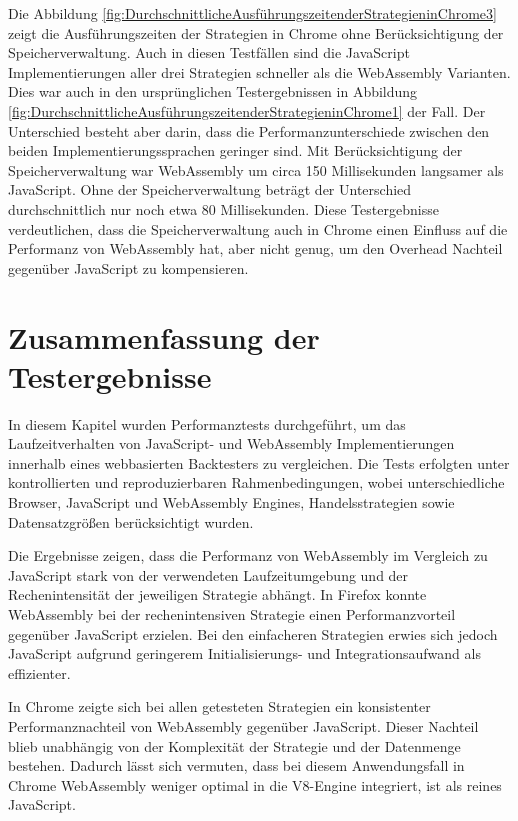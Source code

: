 Die Abbildung \ref{fig:DurchschnittlicheAusführungszeitenderStrategieninChrome3} zeigt die Ausführungszeiten der Strategien in Chrome ohne Berücksichtigung der Speicherverwaltung.
Auch in diesen Testfällen sind die JavaScript Implementierungen aller drei Strategien schneller als die WebAssembly Varianten.
Dies war auch in den ursprünglichen Testergebnissen in Abbildung \ref{fig:DurchschnittlicheAusführungszeitenderStrategieninChrome1} der Fall.
Der Unterschied besteht aber darin, dass die Performanzunterschiede zwischen den beiden Implementierungssprachen geringer sind.
Mit Berücksichtigung der Speicherverwaltung war WebAssembly um circa 150 Millisekunden langsamer als JavaScript.
Ohne der Speicherverwaltung beträgt der Unterschied durchschnittlich nur noch etwa 80 Millisekunden.
Diese Testergebnisse verdeutlichen, dass die Speicherverwaltung auch in Chrome einen Einfluss auf die Performanz von WebAssembly hat, aber nicht genug, um den Overhead Nachteil gegenüber JavaScript zu kompensieren.

\section{Zusammenfassung der Testergebnisse}
\label{sec:ZusammenfassungderTestergebnisse}

In diesem Kapitel wurden Performanztests durchgeführt, um das Laufzeitverhalten von JavaScript- und WebAssembly Implementierungen innerhalb eines webbasierten Backtesters zu vergleichen.
Die Tests erfolgten unter kontrollierten und reproduzierbaren Rahmenbedingungen, wobei unterschiedliche Browser, JavaScript und WebAssembly Engines, Handelsstrategien sowie Datensatzgrößen berücksichtigt wurden.

Die Ergebnisse zeigen, dass die Performanz von WebAssembly im Vergleich zu JavaScript stark von der verwendeten Laufzeitumgebung und der Rechenintensität der jeweiligen Strategie abhängt.
In Firefox konnte WebAssembly bei der rechenintensiven Strategie einen Performanzvorteil gegenüber JavaScript erzielen.
Bei den einfacheren Strategien erwies sich jedoch JavaScript aufgrund geringerem Initialisierungs- und Integrationsaufwand als effizienter.

In Chrome zeigte sich bei allen getesteten Strategien ein konsistenter Performanznachteil von WebAssembly gegenüber JavaScript.
Dieser Nachteil blieb unabhängig von der Komplexität der Strategie und der Datenmenge bestehen.
Dadurch lässt sich vermuten, dass bei diesem Anwendungsfall in Chrome WebAssembly weniger optimal in die V8-Engine integriert, ist als reines JavaScript.

